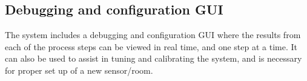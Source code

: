 \subsection{Debugging and configuration GUI}
The system includes a debugging and configuration GUI where the results from each of the process steps can be viewed in real time, and one step at a time. It can also be used to assist in tuning and calibrating the system, and is necessary for proper set up of a new sensor/room. 
